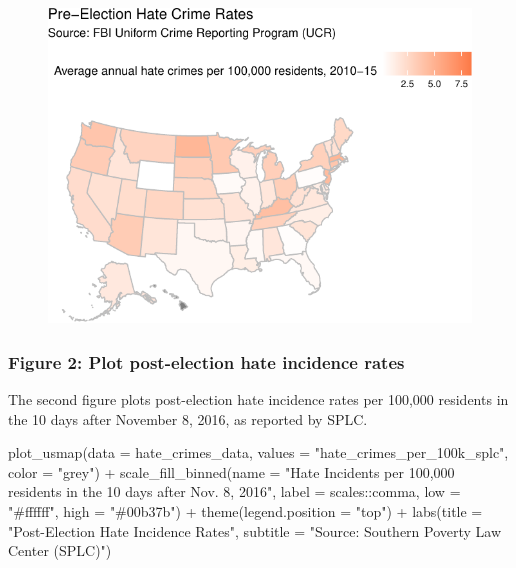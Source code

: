 \documentclass[
  letterpaper,
  DIV=11,
  numbers=noendperiod]{scrartcl}
\newenvironment{Shaded}{\begin{snugshade}}{\end{snugshade}}
\newcommand{\AttributeTok}[1]{\textcolor[rgb]{0.40,0.45,0.13}{#1}}
\newcommand{\FunctionTok}[1]{\textcolor[rgb]{0.28,0.35,0.67}{#1}}
\newcommand{\NormalTok}[1]{\textcolor[rgb]{0.00,0.23,0.31}{#1}}
\newcommand{\SpecialCharTok}[1]{\textcolor[rgb]{0.37,0.37,0.37}{#1}}
\newcommand{\StringTok}[1]{\textcolor[rgb]{0.13,0.47,0.30}{#1}}
\begin{document}
\begin{figure}[H]

{\centering \includegraphics{hate_crimes_reproduction_files/figure-pdf/pre-election-hate-crimes-1.pdf}

}

\end{figure}

\hypertarget{figure-2-plot-post-election-hate-incidence-rates}{%
\subsubsection{Figure 2: Plot post-election hate incidence
rates}\label{figure-2-plot-post-election-hate-incidence-rates}}

The second figure plots post-election hate incidence rates per 100,000
residents in the 10 days after November 8, 2016, as reported by SPLC.

\begin{Shaded}
\begin{Highlighting}[]
\FunctionTok{plot\_usmap}\NormalTok{(}\AttributeTok{data =}\NormalTok{ hate\_crimes\_data, }\AttributeTok{values =} \StringTok{"hate\_crimes\_per\_100k\_splc"}\NormalTok{, }\AttributeTok{color =} \StringTok{"grey"}\NormalTok{) }\SpecialCharTok{+} 
  \FunctionTok{scale\_fill\_binned}\NormalTok{(}\AttributeTok{name =} \StringTok{"Hate Incidents per 100,000 residents in the 10 days after Nov. 8, 2016"}\NormalTok{, }\AttributeTok{label =}\NormalTok{ scales}\SpecialCharTok{::}\NormalTok{comma, }\AttributeTok{low =} \StringTok{"\#ffffff"}\NormalTok{, }\AttributeTok{high =} \StringTok{"\#00b37b"}\NormalTok{) }\SpecialCharTok{+} 
  \FunctionTok{theme}\NormalTok{(}\AttributeTok{legend.position =} \StringTok{"top"}\NormalTok{) }\SpecialCharTok{+}
  \FunctionTok{labs}\NormalTok{(}\AttributeTok{title =} \StringTok{"Post{-}Election Hate Incidence Rates"}\NormalTok{,}
       \AttributeTok{subtitle =} \StringTok{"Source: Southern Poverty Law Center (SPLC)"}\NormalTok{)}
\end{Highlighting}
\end{Shaded}
\end{document}
